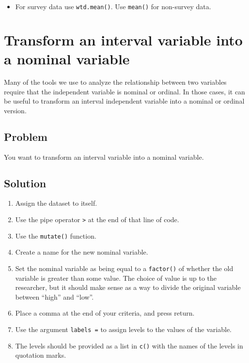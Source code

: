 \documentclass[
]{book}
\providecommand{\tightlist}{%
  \setlength{\itemsep}{0pt}\setlength{\parskip}{0pt}}
\begin{document}
\begin{itemize}
\tightlist
\item
  For survey data use \texttt{wtd.mean()}. Use \texttt{mean()} for non-survey data.
\end{itemize}

\hypertarget{transform_nom}{%
\section{Transform an interval variable into a nominal variable}\label{transform_nom}}

Many of the tools we use to analyze the relationship between two variables require that the independent variable is nominal or ordinal. In those cases, it can be useful to transform an interval independent variable into a nominal or ordinal version.

\hypertarget{problem-23}{%
\subsection{Problem}\label{problem-23}}

You want to transform an interval variable into a nominal variable.

\hypertarget{solution-22}{%
\subsection{Solution}\label{solution-22}}

\begin{enumerate}
\def\labelenumi{\arabic{enumi}.}
\tightlist
\item
  Assign the dataset to itself.
\item
  Use the pipe operator \texttt{\textbar{}\textgreater{}} at the end of that line of code.
\item
  Use the \texttt{mutate()} function.
\item
  Create a name for the new nominal variable.
\item
  Set the nominal variable as being equal to a \texttt{factor()} of whether the old variable is greater than some value. The choice of value is up to the researcher, but it should make sense as a way to divide the original variable between ``high'' and ``low''.
\item
  Place a comma at the end of your criteria, and press return.
\item
  Use the argument \texttt{labels\ =} to assign levels to the values of the variable.
\item
  The levels should be provided as a list in \texttt{c()} with the names of the levels in quotation marks.
\end{enumerate}
\end{document}
